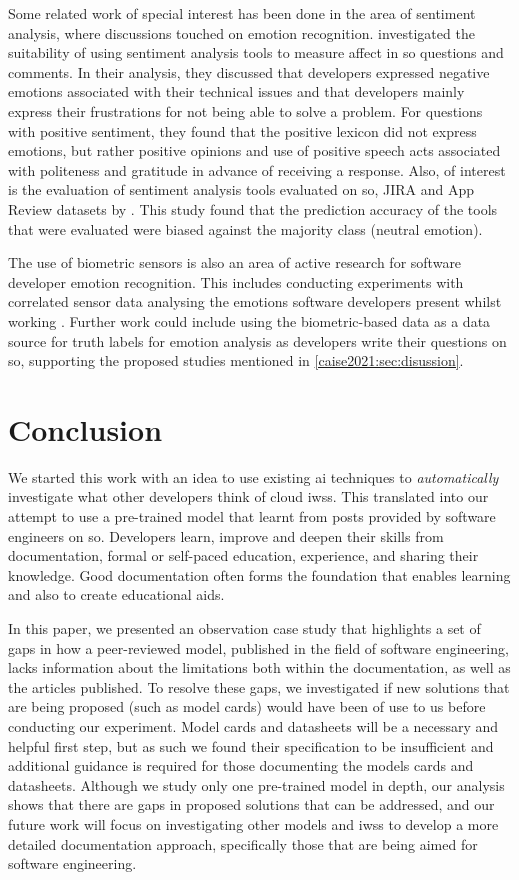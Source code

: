 Some related work of special interest has been done in the area of sentiment analysis, where discussions touched on emotion recognition. \citet{Novielli:2015vda} investigated the suitability of using sentiment analysis tools to measure affect in \gls{so} questions and comments.  In their analysis, they discussed that developers expressed negative emotions associated with their technical issues and that developers mainly express their frustrations for not being able to solve a problem. For questions with positive sentiment, they found that the positive lexicon did not express emotions, but rather positive opinions and use of positive speech acts associated with politeness and gratitude in advance of receiving a response.  Also, of interest is the evaluation of sentiment analysis tools evaluated on \gls{so}, JIRA and App Review datasets by \citet{lin2018sentiment}.  This study found that the prediction accuracy of the tools that were evaluated were biased against the majority class (neutral emotion).

The use of biometric sensors is also an area of active research for software developer emotion recognition.  This includes conducting experiments with correlated sensor data analysing the emotions software developers present whilst working \citep{Girardi2020}.  Further work could include using the biometric-based data as a data source for truth labels for emotion analysis as developers write their questions on \gls{so}, supporting the proposed studies mentioned in \cref{caise2021:sec:disussion}.

\section{Conclusion}\label{caise2021:sec:conclusion}
We started this work with an idea to use existing \gls{ai} techniques to \textit{automatically} investigate what other developers think of cloud \glspl{iws}. This translated into our attempt to use a  pre-trained model that learnt from posts provided by software engineers on \gls{so}. Developers learn, improve and deepen their skills from documentation, formal or self-paced education, experience, and sharing their knowledge. Good documentation often forms the foundation that enables learning and also to create educational aids. 

In this paper, we presented an observation case study that highlights a set of gaps in how a peer-reviewed model, published in the field of software engineering, lacks information about the limitations both within the documentation, as well as the articles published. To resolve these gaps, we investigated if new solutions that are being proposed (such as model cards) would have been of use to us before conducting our experiment. Model cards and datasheets will be a necessary and helpful first step, but as such we found their specification to be insufficient and additional guidance is required for those documenting the models cards and datasheets. Although we study only one pre-trained model in depth, our analysis shows that there are gaps in proposed solutions that can be addressed, and our future work will focus on investigating other models and \glspl{iws} to develop a more detailed documentation approach, specifically those that are being aimed for software engineering. 